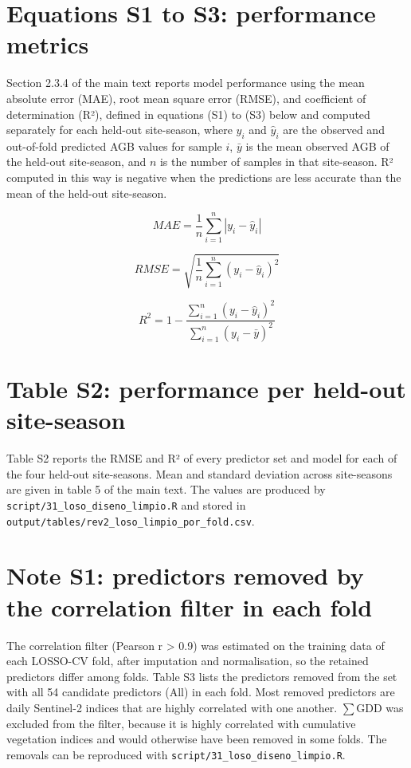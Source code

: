 \documentclass[
  british,
  suppldata]{interact}
\begin{document}
\endgroup

\section{Equations S1 to S3: performance
metrics}\label{equations-s1-to-s3-performance-metrics}

Section 2.3.4 of the main text reports model performance using the mean
absolute error (MAE), root mean square error (RMSE), and coefficient of
determination (R²), defined in equations (S1) to (S3) below and computed
separately for each held-out site-season, where \(y_i\) and
\(\hat{y}_i\) are the observed and out-of-fold predicted AGB values for
sample \(i\), \(\bar{y}\) is the mean observed AGB of the held-out
site-season, and \(n\) is the number of samples in that site-season. R²
computed in this way is negative when the predictions are less accurate
than the mean of the held-out site-season.

\[
MAE = \frac{1}{n}\sum_{i=1}^{n}\left|y_i - \hat{y}_i\right| \tag{S1}
\]

\[
RMSE = \sqrt{\frac{1}{n}\sum_{i=1}^{n}\left(y_i - \hat{y}_i\right)^2} \tag{S2}
\]

\[
R^2 = 1 - \frac{\displaystyle\sum_{i=1}^{n}\left(y_i - \hat{y}_i\right)^2}{\displaystyle\sum_{i=1}^{n}\left(y_i - \bar{y}\right)^2} \tag{S3}
\]

\section{Table S2: performance per held-out
site-season}\label{table-s2-performance-per-held-out-site-season}

Table S2 reports the RMSE and R² of every predictor set and model for
each of the four held-out site-seasons. Mean and standard deviation
across site-seasons are given in table 5 of the main text. The values
are produced by \texttt{script/31\_loso\_diseno\_limpio.R} and stored in
\texttt{output/tables/rev2\_loso\_limpio\_por\_fold.csv}.



\section{Note S1: predictors removed by the correlation filter in each
fold}\label{note-s1-predictors-removed-by-the-correlation-filter-in-each-fold}

The correlation filter (Pearson r \textgreater{} 0.9) was estimated on
the training data of each LOSSO-CV fold, after imputation and
normalisation, so the retained predictors differ among folds. Table S3
lists the predictors removed from the set with all 54 candidate
predictors (All) in each fold. Most removed predictors are daily
Sentinel-2 indices that are highly correlated with one another.
\(\sum\)GDD was excluded from the filter, because it is highly
correlated with cumulative vegetation indices and would otherwise have
been removed in some folds. The removals can be reproduced with
\texttt{script/31\_loso\_diseno\_limpio.R}.
\end{document}
